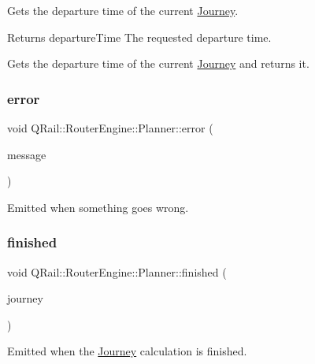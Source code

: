 Gets the departure time of the current \mbox{\hyperlink{classQRail_1_1RouterEngine_1_1Journey}{Journey}}. 

\begin{DoxyReturn}{Returns}
departure\+Time The requested departure time.
\end{DoxyReturn}
Gets the departure time of the current \mbox{\hyperlink{classQRail_1_1RouterEngine_1_1Journey}{Journey}} and returns it. \mbox{\label{classQRail_1_1RouterEngine_1_1Planner_af6fce3843991fb2ab155fba9bfd3e6b4}} 
\subsubsection{\texorpdfstring{error}{error}}
{\footnotesize\ttfamily void Q\+Rail\+::\+Router\+Engine\+::\+Planner\+::error (\begin{DoxyParamCaption}\item[{const Q\+String \&}]{message }\end{DoxyParamCaption})\hspace{0.3cm}{\ttfamily [signal]}}



Emitted when something goes wrong. 

\mbox{\label{classQRail_1_1RouterEngine_1_1Planner_ada19d57ce540325d6de9c29521ca6dfd}} 
\subsubsection{\texorpdfstring{finished}{finished}}
{\footnotesize\ttfamily void Q\+Rail\+::\+Router\+Engine\+::\+Planner\+::finished (\begin{DoxyParamCaption}\item[{\mbox{\hyperlink{classQRail_1_1RouterEngine_1_1Journey}{Q\+Rail\+::\+Router\+Engine\+::\+Journey}} $\ast$}]{journey }\end{DoxyParamCaption})\hspace{0.3cm}{\ttfamily [signal]}}



Emitted when the \mbox{\hyperlink{classQRail_1_1RouterEngine_1_1Journey}{Journey}} calculation is finished. 

